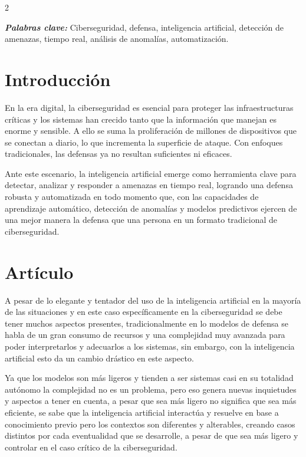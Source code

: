 \documentclass[12pt,spanish,Letterpaper,openany]{book}
\begin{document}
\begin {multicols}{2}

\textbf{\emph{Palabras clave:}} Ciberseguridad, defensa, inteligencia artificial, detección de amenazas, tiempo real, análisis de anomalías, automatización.

\section{Introducción}\label{introducciuxf3n-11}

En la era digital, la ciberseguridad es esencial para proteger las infraestructuras críticas y los sistemas han crecido tanto que la información que manejan es enorme y sensible. A ello se suma la proliferación de millones de dispositivos que se conectan a diario, lo que incrementa la superficie de ataque. Con enfoques tradicionales, las defensas ya no resultan suficientes ni eficaces.

Ante este escenario, la inteligencia artificial emerge como herramienta clave para detectar, analizar y responder a amenazas en tiempo real, logrando una defensa robusta y automatizada en todo momento que, con las capacidades de aprendizaje automático, detección de anomalías y modelos predictivos ejercen de una mejor manera la defensa que una persona en un formato tradicional de ciberseguridad.

\section{Artículo}\label{artuxedculo-11}

\bigskip

A pesar de lo elegante y tentador del uso de la inteligencia artificial en la mayoría de las situaciones y en este caso específicamente en la ciberseguridad se debe tener muchos aspectos presentes, tradicionalmente en lo modelos de defensa se habla de un gran consumo de recursos y una complejidad muy avanzada para poder interpretarlos y adecuarlos a los sistemas, sin embargo, con la inteligencia artificial esto da un cambio drástico en este aspecto.

Ya que los modelos son más ligeros y tienden a ser sistemas casi en su totalidad autónomo la complejidad no es un problema, pero eso genera nuevas inquietudes y aspectos a tener en cuenta, a pesar que sea más ligero no significa que sea más eficiente, se sabe que la inteligencia artificial interactúa y resuelve en base a conocimiento previo pero los contextos son diferentes y alterables, creando casos distintos por cada eventualidad que se desarrolle, a pesar de que sea más ligero y controlar en el caso crítico de la ciberseguridad.


\end{multicols}
\end{document}
